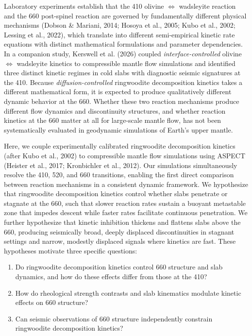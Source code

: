 \documentclass[draft,linenumbers]{agujournal2019}
\providecommand{\tightlist}{\setlength{\itemsep}{0pt}\setlength{\parskip}{0pt}}
\begin{document}
Laboratory experiments establish that the 410 olivine
\(\Leftrightarrow\) wadsleyite reaction and the 660 post-spinel reaction
are governed by fundamentally different physical mechanisms (Dobson \&
Mariani, 2014; Hosoya et al., 2005; Kubo et al., 2002; Lessing et al.,
2022), which translate into different semi-empirical kinetic rate
equations with distinct mathematical formulations and parameter
dependencies. In a companion study, Kerswell et al. (2026) coupled
\emph{interface-controlled} olivine \(\Leftrightarrow\) wadsleyite
kinetics to compressible mantle flow simulations and identified three
distinct kinetic regimes in cold slabs with diagnostic seismic
signatures at the 410. Because \emph{diffusion-controlled} ringwoodite
decomposition kinetics takes a different mathematical form, it is
expected to produce qualitatively different dynamic behavior at the 660.
Whether these two reaction mechanisms produce different flow dynamics
and discontinuity structures, and whether reaction kinetics at the 660
matter at all for large-scale mantle flow, has not been systematically
evaluated in geodynamic simulations of Earth's upper mantle.

Here, we couple experimentally calibrated ringwoodite decomposition
kinetics (after Kubo et al., 2002) to compressible mantle flow
simulations using ASPECT (Heister et al., 2017; Kronbichler et al.,
2012). Our simulations simultaneously resolve the 410, 520, and 660
transitions, enabling the first direct comparison between reaction
mechanisms in a consistent dynamic framework. We hypothesize that
ringwoodite decomposition kinetics control whether slabs penetrate or
stagnate at the 660, such that slower reaction rates sustain a buoyant
metastable zone that impedes descent while faster rates facilitate
continuous penetration. We further hypothesize that kinetic inhibition
thickens and flattens slabs above the 660, producing seismically broad,
deeply displaced discontinuities in stagnant settings and narrow,
modestly displaced signals where kinetics are fast. These hypotheses
motivate three specific questions:

\begin{enumerate}
\def\labelenumi{\arabic{enumi}.}
\tightlist
\item
  Do ringwoodite decomposition kinetics control 660 structure and slab
  dynamics, and how do these effects differ from those at the 410?
\item
  How do rheological strength contrasts and slab kinematics modulate
  kinetic effects on 660 structure?
\item
  Can seismic observations of 660 structure independently constrain
  ringwoodite decomposition kinetics?
\end{enumerate}
\end{document}
